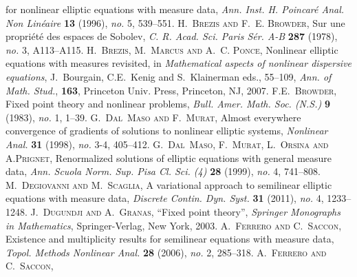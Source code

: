\documentclass[twoside,reqno]{amsart}
\numberwithin{equation}{section}
\theoremstyle{definition}
\newcommand{\au}[1]{\textsc{#1}}
\newcommand{\titleart}[1]{\textrm{#1}}
\newcommand{\jour}[1]{\textit{#1}}
\newcommand{\volart}[1]{\textbf{#1}}
\newcommand{\no}[1]{\textit{no.} {#1}}
\begin{document}
\begin{thebibliography}{99}
{for nonlinear elliptic equations with measure data},
\jour{Ann. Inst. H. Poincar\'e Anal. Non Lin\'eaire}
\volart{13} (1996), \no{5}, 539--551.
%
%
\au{H.~Brezis and F.~E. Browder}, 
\titleart{Sur une propri\'et\'e des espaces de {S}obolev},
\jour{C. R. Acad. Sci. Paris S\'er. A-B}
\volart{287} (1978), \no{3}, A113--A115.
%
\au{H.~Brezis, M.~Marcus and A.~C. Ponce}, 
{Nonlinear elliptic equations with measures revisited}, 
in \textit{Mathematical aspects of nonlinear dispersive equations}, 
J.~Bourgain, C.E.~Kenig and S.~Klainerman eds., 55--109, 
\textit{Ann. of Math. Stud.}, \textbf{163}, Princeton Univ. Press, 
Princeton, NJ, 2007.
%
\au{F.E.~Browder},
\titleart{Fixed point theory and nonlinear problems},
\jour{Bull. Amer. Math. Soc. (N.S.)} \volart{9} 
(1983), \no{1}, 1--39.
%
%
\au{\sc G.~Dal~Maso and F.~Murat},
\titleart{Almost everywhere convergence of gradients 
of solutions to nonlinear elliptic systems},
\jour{Nonlinear Anal.} \volart{31} (1998),
\no{3-4}, 405--412.
%
\au{G.~Dal~Maso, F.~Murat, L.~Orsina and A.Prignet},
\titleart{Renormalized solutions of elliptic equations 
with general measure data},
\jour{Ann. Scuola Norm. Sup. Pisa Cl. Sci. (4)} 
\volart{28} (1999), \no{4}, 741--808.
%
\au{M.~Degiovanni and M.~Scaglia},
\titleart{A variational approach to semilinear elliptic 
equations with measure data},
\jour{Discrete Contin. Dyn. Syst.} \volart{31} (2011), 
\no{4}, 1233--1248.
%
%
\au{J.~Dugundji and A.~Granas}, 
``Fixed point theory'', 
\textit{Springer Monographs in Mathematics}, 
Springer-Verlag, New York, 2003.
%
\au{A.~Ferrero and C.~Saccon},
\titleart{Existence and multiplicity results for
 semilinear equations with measure data}, 
\jour{Topol. Methods Nonlinear Anal.} \volart{28} 
(2006), \no{2}, 285--318.
%
\au{A.~Ferrero and C.~Saccon},

\end{thebibliography}
\end{document}
